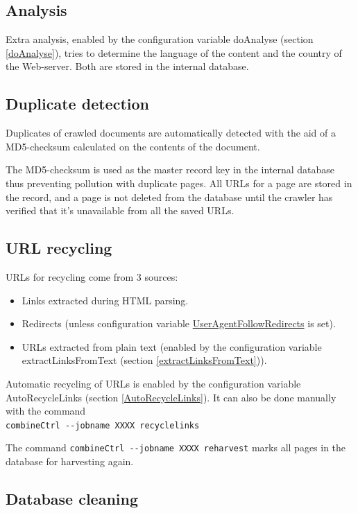 \subsection{Analysis}
\label{analysis}
Extra analysis, enabled by the configuration variable 
doAnalyse (section \ref{doAnalyse}), tries to determine
the language of the content and the country of the Web-server.
Both are stored in the internal database.

\subsection{Duplicate detection}
Duplicates of crawled documents are automatically detected with the
aid of a MD5-checksum calculated on the contents of the document.

The MD5-checksum is used as the master record key in the internal
database thus preventing pollution with duplicate pages. All URLs
for a page are stored in the record, and a page is not deleted from
the database until the crawler has verified that it's unavailable
from all the saved URLs.

\subsection{URL recycling}
URLs for recycling come from 3 sources:
\begin{itemize}
\item Links extracted during HTML parsing.
\item Redirects (unless configuration variable \hyperref{UserAgentFollowRedirects}{UserAgentFollowRedirects (section }{)}{UserAgentFollowRedirects} is set).
\item URLs extracted from plain text (enabled by the configuration variable
extractLinksFromText (section \ref{extractLinksFromText})).
\end{itemize}

Automatic recycling of URLs is enabled by the configuration variable
AutoRecycleLinks (section \ref{AutoRecycleLinks}). It can also be done
manually with the command\\
\verb+combineCtrl --jobname XXXX recyclelinks+

The command \verb+combineCtrl --jobname XXXX reharvest+ marks all
pages in the database for harvesting again.

\subsection{Database cleaning}

